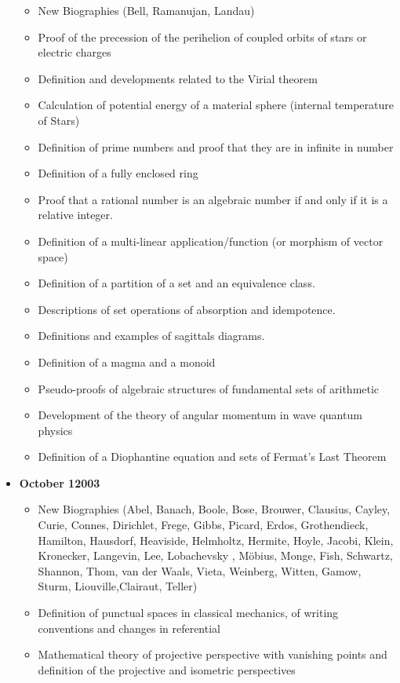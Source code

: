 \begin{itemize}
		\begin{itemize}[noitemsep]
			\item New Biographies (Bell, Ramanujan, Landau)
			\item Proof of the precession of the perihelion of coupled orbits of stars or electric charges
			\item Definition and developments related to the Virial theorem
			\item Calculation of potential energy of a material sphere (internal temperature of Stars)
			\item Definition of prime numbers and proof that they are in infinite in number
			\item Definition of a fully enclosed ring
			\item Proof that a rational number is an algebraic number if and only if it is a relative integer.
			\item Definition of a multi-linear application/function (or morphism of vector space)
			\item Definition of a partition of a set and an equivalence class.
			\item Descriptions of set operations of absorption and idempotence.
			\item Definitions and examples of sagittals diagrams.
			\item Definition of a magma and a monoid
			\item Pseudo-proofs of algebraic structures of fundamental sets of arithmetic
			\item Development of the theory of angular momentum in wave quantum physics
			\item Definition of a Diophantine equation and sets of Fermat's Last Theorem
		\end{itemize}
	\item \textbf{October 12003}
		\begin{itemize}[noitemsep]
			\item New Biographies (Abel, Banach, Boole, Bose, Brouwer, Clausius, Cayley, Curie,  Connes, Dirichlet, Frege, Gibbs, Picard, Erdos, Grothendieck, Hamilton, Hausdorf,  Heaviside, Helmholtz, Hermite, Hoyle, Jacobi, Klein, Kronecker, Langevin, Lee, Lobachevsky , Möbius, Monge, Fish, Schwartz, Shannon, Thom, van der Waals, Vieta, Weinberg, Witten, Gamow, Sturm, Liouville,Clairaut, Teller)
			\item Definition of punctual spaces in classical mechanics, of writing conventions and changes in referential
			\item Mathematical theory of projective perspective with vanishing points and definition of the projective and isometric perspectives

\end{itemize}
\end{itemize}
